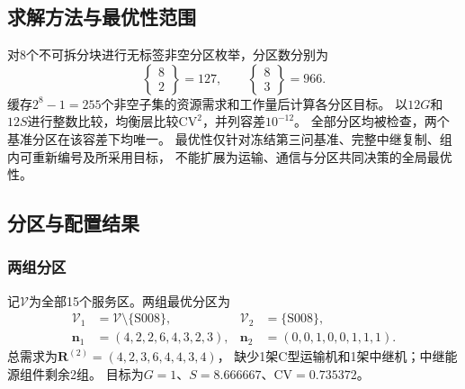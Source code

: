 \subsection{求解方法与最优性范围}
对8个不可拆分块进行无标签非空分区枚举，分区数分别为
\begin{equation}
\left\{\begin{matrix}8\\2\end{matrix}\right\}=127,
\qquad
\left\{\begin{matrix}8\\3\end{matrix}\right\}=966.
\end{equation}
缓存$2^8-1=255$个非空子集的资源需求和工作量后计算各分区目标。
以$12G$和$12S$进行整数比较，均衡层比较$\mathrm{CV}^2$，并列容差$10^{-12}$。
全部分区均被检查，两个基准分区在该容差下均唯一。
最优性仅针对冻结第三问基准、完整中继复制、组内可重新编号及所采用目标，
不能扩展为运输、通信与分区共同决策的全局最优性。

\subsection{分区与配置结果}
\subsubsection{两组分区}
记$\mathcal V$为全部15个服务区。两组最优分区为
\begin{align}
\mathcal V_1&=\mathcal V\setminus\{\mathrm{S008}\},&
\mathcal V_2&=\{\mathrm{S008}\},\\
\boldsymbol n_1&=(4,2,2,6,4,3,2,3),&
\boldsymbol n_2&=(0,0,1,0,0,1,1,1).
\end{align}
总需求为$\boldsymbol R^{(2)}=(4,2,3,6,4,4,3,4)$，
缺少1架C型运输机和1架中继机；中继能源组件剩余2组。
目标为$G=1$、$S=8.666667$、$\mathrm{CV}=0.735372$。

